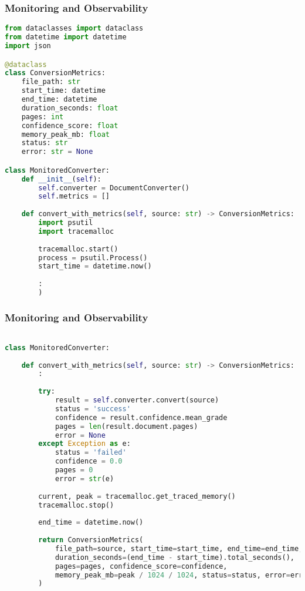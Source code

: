 \begin{frame}[fragile]\frametitle{Monitoring and Observability}

\begin{lstlisting}[language=Python, basicstyle=\tiny]
from dataclasses import dataclass
from datetime import datetime
import json

@dataclass
class ConversionMetrics:
    file_path: str
    start_time: datetime
    end_time: datetime
    duration_seconds: float
    pages: int
    confidence_score: float
    memory_peak_mb: float
    status: str
    error: str = None

class MonitoredConverter:
    def __init__(self):
        self.converter = DocumentConverter()
        self.metrics = []
        
    def convert_with_metrics(self, source: str) -> ConversionMetrics:
        import psutil
        import tracemalloc
        
        tracemalloc.start()
        process = psutil.Process()
        start_time = datetime.now()
        
		:
        )
\end{lstlisting}
\end{frame}

\begin{frame}[fragile]\frametitle{Monitoring and Observability}

\begin{lstlisting}[language=Python, basicstyle=\tiny]

class MonitoredConverter:
        
    def convert_with_metrics(self, source: str) -> ConversionMetrics:
        :
		
        try:
            result = self.converter.convert(source)
            status = 'success'
            confidence = result.confidence.mean_grade
            pages = len(result.document.pages)
            error = None
        except Exception as e:
            status = 'failed'
            confidence = 0.0
            pages = 0
            error = str(e)
        
        current, peak = tracemalloc.get_traced_memory()
        tracemalloc.stop()
        
        end_time = datetime.now()
        
        return ConversionMetrics(
            file_path=source, start_time=start_time, end_time=end_time,
            duration_seconds=(end_time - start_time).total_seconds(),
            pages=pages, confidence_score=confidence,
            memory_peak_mb=peak / 1024 / 1024, status=status, error=error
        )
\end{lstlisting}
\end{frame}

